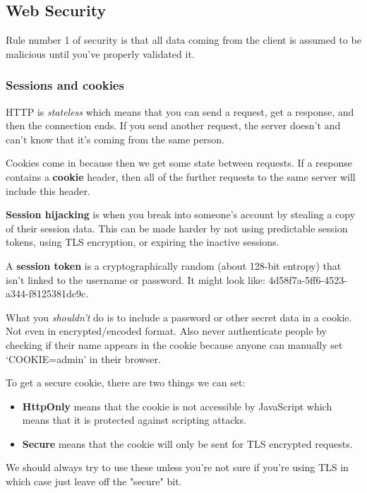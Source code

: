 \documentclass[11pt,a4paper,titlepage,dvipsnames,cmyk]{scrartcl}
\begin{document}
\subsection{Web Security}%
\label{sub:web-security}

Rule number 1 of security is that all data coming from the client is
assumed to be malicious until you've properly validated it.

\subsubsection{Sessions and cookies}%
\label{ssub:sessions}

HTTP is \textit{stateless} which means that you can send a request, get a
response, and then the connection ends. If you send another request, the
server doesn't and can't know that it's coming from the same person.

Cookies come in because then we get some state between requests. If a
response contains a \textbf{cookie} header, then all of the further
requests to the same server will include this header.

\textbf{Session hijacking} is when you break into someone's account by
stealing a copy of their session data. This can be made harder by not
using predictable session tokens, using TLS encryption, or expiring the
inactive sessions.

A \textbf{session token} is a cryptographically random (about 128-bit
entropy) that isn't linked to the username or password. It might look
like: 4d58f7a-5ff6-4523-a344-f8125381dc9c.

What you \textit{shouldn't} do is to include a password or other secret
data in a cookie. Not even in encrypted/encoded format. Also never
authenticate people by checking if their name appears in the cookie
because anyone can manually set `COOKIE=admin' in their browser.

To get a secure cookie, there are two things we can set:

\begin{itemize}
    \item \textbf{HttpOnly} means that the cookie is not accessible by
        JavaScript which means that it is protected against scripting
        attacks.
    \item \textbf{Secure} means that the cookie will only be sent for TLS
        encrypted requests.
\end{itemize}

We should always try to use these unless you're not sure if you're using
TLS in which case just leave off the "secure" bit.
\end{document}
